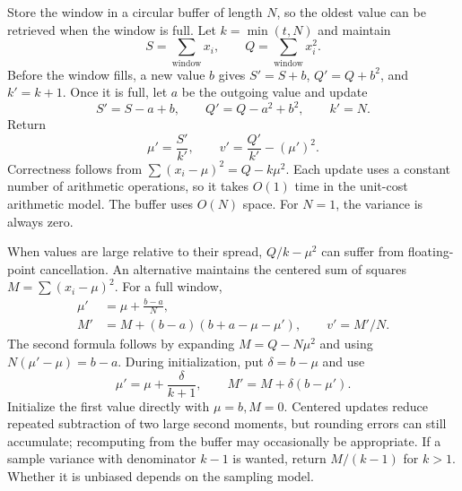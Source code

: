 Store the window in a circular buffer of length $N$, so the oldest value can be retrieved when the window is full. Let $k=\min(t,N)$ and maintain
\[
 S=\sum_{\text{window}}x_i,\qquad Q=\sum_{\text{window}}x_i^2.
\]
Before the window fills, a new value $b$ gives $S'=S+b$, $Q'=Q+b^2$, and $k'=k+1$. Once it is full, let $a$ be the outgoing value and update
\[
 S'=S-a+b,\qquad Q'=Q-a^2+b^2,
 \qquad k'=N.
\]
Return
\[
 \mu'=\frac{S'}{k'},\qquad
 v'=\frac{Q'}{k'}-(\mu')^2.
\]
Correctness follows from $\sum(x_i-\mu)^2=Q-k\mu^2$. Each update uses a constant number of arithmetic operations, so it takes $O(1)$ time in the unit-cost arithmetic model. The buffer uses $O(N)$ space. For $N=1$, the variance is always zero.

When values are large relative to their spread, $Q/k-\mu^2$ can suffer from floating-point cancellation. An alternative maintains the centered sum of squares $M=\sum(x_i-\mu)^2$. For a full window,
\[
 \begin{aligned}
 \mu'&=\mu+\frac{b-a}{N},\\
 M'&=M+(b-a)(b+a-\mu-\mu'),\qquad v'=M'/N.
 \end{aligned}
\]
The second formula follows by expanding $M=Q-N\mu^2$ and using $N(\mu'-\mu)=b-a$. During initialization, put $\delta=b-\mu$ and use
\[
 \mu'=\mu+\frac{\delta}{k+1},\qquad
 M'=M+\delta(b-\mu').
\]
Initialize the first value directly with $\mu=b,M=0$. Centered updates reduce repeated subtraction of two large second moments, but rounding errors can still accumulate; recomputing from the buffer may occasionally be appropriate. If a sample variance with denominator $k-1$ is wanted, return $M/(k-1)$ for $k>1$. Whether it is unbiased depends on the sampling model.
